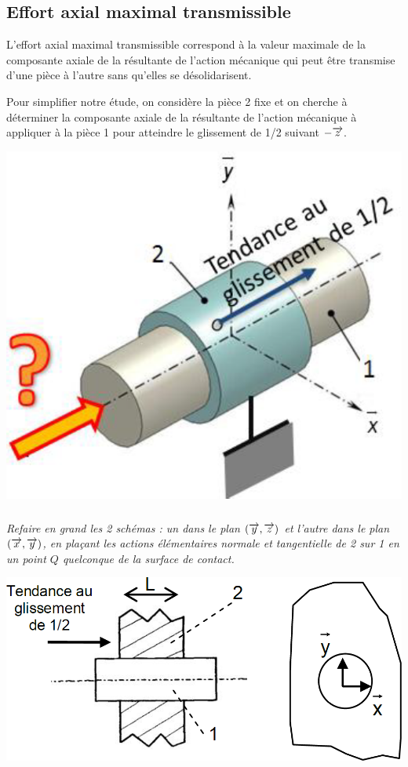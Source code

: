 \documentclass[10pt,fleqn]{article} %
\begin{document}
\begin{multicols}{2}
\subsection*{Effort axial maximal transmissible}


L’effort axial maximal transmissible correspond à la valeur maximale de la 
composante axiale de la résultante de l’action mécanique qui peut être transmise 
d’une pièce à l’autre sans qu’elles se désolidarisent. 
 
Pour simplifier notre étude, on considère la pièce 2 fixe et on cherche à déterminer 
la composante axiale de la résultante de l’action mécanique à appliquer à la pièce 1 
pour atteindre le glissement de 1/2 suivant $-\overrightarrow{z}$. 


\begin{center}
\includegraphics[width=.8\linewidth]{images/fig_02}
\end{center}


\subparagraph{}
\textit{Refaire en grand les 2 schémas : un 
dans le plan $(\overrightarrow{y}, \overrightarrow{z})$ et l’autre dans le plan $(\overrightarrow{x}, \overrightarrow{y})$, 
en plaçant les actions élémentaires normale et 
tangentielle de 2 sur 1 en un point $Q$ 
quelconque de la surface de contact. }

\begin{center}
\includegraphics[width=.8\linewidth]{images/fig_03}
\end{center}



\end{multicols}
\end{document}
